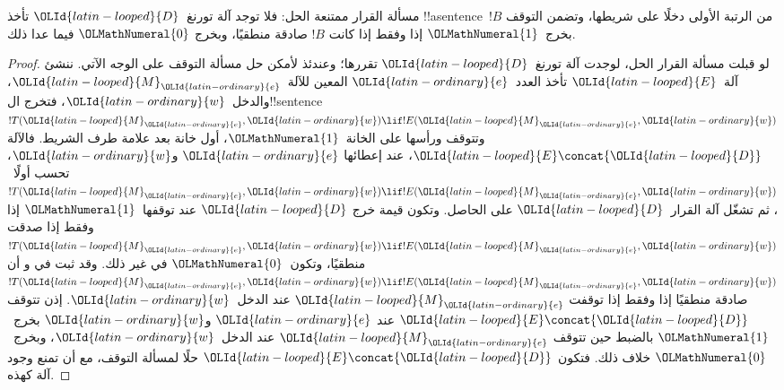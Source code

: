 \documentclass[../../../include/open-logic-section]{subfiles}
\begin{document}

\begin{thm}
مسألة القرار ممتنعة الحل: فلا توجد آلة تورنغ~${\OLId{latin-looped}{D}}$ تأخذ
!!a{sentence}~$!B$ من الرتبة الأولى دخلًا على شريطها، وتضمن
التوقف بخرج~${\OLMathNumeral{1}}$ إذا وفقط إذا كانت $!B$ صادقة منطقيًا، وبخرج
${\OLMathNumeral{0}}$ فيما عدا ذلك.
\end{thm}

\begin{proof}
لو قبلت مسألة القرار الحل، لوجدت آلة تورنغ~${\OLId{latin-looped}{D}}$ تقررها؛ وعندئذ
لأمكن حل مسألة التوقف على الوجه الآتي. ننشئ آلة~${\OLId{latin-looped}{E}}$ تأخذ
  العدد~${\OLId{latin-ordinary}{e}}$ المعين للآلة~${\OLId{latin-looped}{M}}_{\OLId{latin-ordinary}{e}}$، والدخل~${\OLId{latin-ordinary}{w}}$، فتخرج
  ال!!{sentence} $!T({\OLId{latin-looped}{M}}_{\OLId{latin-ordinary}{e}},{\OLId{latin-ordinary}{w}})\lif !E({\OLId{latin-looped}{M}}_{\OLId{latin-ordinary}{e}},{\OLId{latin-ordinary}{w}})$ وتتوقف ورأسها على
  الخانة~${\OLMathNumeral{1}}$، أول خانة بعد علامة طرف الشريط. فالآلة ${\OLId{latin-looped}{E}}\concat {\OLId{latin-looped}{D}}$، عند إعطائها
${\OLId{latin-ordinary}{e}}$ و${\OLId{latin-ordinary}{w}}$، تحسب أولًا~$!T({\OLId{latin-looped}{M}}_{\OLId{latin-ordinary}{e}},{\OLId{latin-ordinary}{w}})\lif !E({\OLId{latin-looped}{M}}_{\OLId{latin-ordinary}{e}},{\OLId{latin-ordinary}{w}})$، ثم تشغّل
آلة القرار~${\OLId{latin-looped}{D}}$ على الحاصل. وتكون قيمة خرج ${\OLId{latin-looped}{D}}$ عند توقفها~${\OLMathNumeral{1}}$
إذا وفقط إذا صدقت $!T({\OLId{latin-looped}{M}}_{\OLId{latin-ordinary}{e}},{\OLId{latin-ordinary}{w}})\lif !E({\OLId{latin-looped}{M}}_{\OLId{latin-ordinary}{e}},{\OLId{latin-ordinary}{w}})$ منطقيًا،
وتكون~${\OLMathNumeral{0}}$ في غير ذلك. وقد ثبت في 
و أن
$!T({\OLId{latin-looped}{M}}_{\OLId{latin-ordinary}{e}},{\OLId{latin-ordinary}{w}})\lif !E({\OLId{latin-looped}{M}}_{\OLId{latin-ordinary}{e}},{\OLId{latin-ordinary}{w}})$ صادقة منطقيًا إذا وفقط إذا توقفت
${\OLId{latin-looped}{M}}_{\OLId{latin-ordinary}{e}}$ عند الدخل~${\OLId{latin-ordinary}{w}}$. إذن تتوقف ${\OLId{latin-looped}{E}}\concat {\OLId{latin-looped}{D}}$ عند
${\OLId{latin-ordinary}{e}}$ و${\OLId{latin-ordinary}{w}}$ بخرج~${\OLMathNumeral{1}}$ بالضبط حين تتوقف ${\OLId{latin-looped}{M}}_{\OLId{latin-ordinary}{e}}$ عند الدخل~${\OLId{latin-ordinary}{w}}$،
وبخرج~${\OLMathNumeral{0}}$ خلاف ذلك. فتكون ${\OLId{latin-looped}{E}}\concat {\OLId{latin-looped}{D}}$ حلًا لمسألة التوقف،
  مع أن  تمنع وجود آلة كهذه.
\end{proof}
\end{document}
